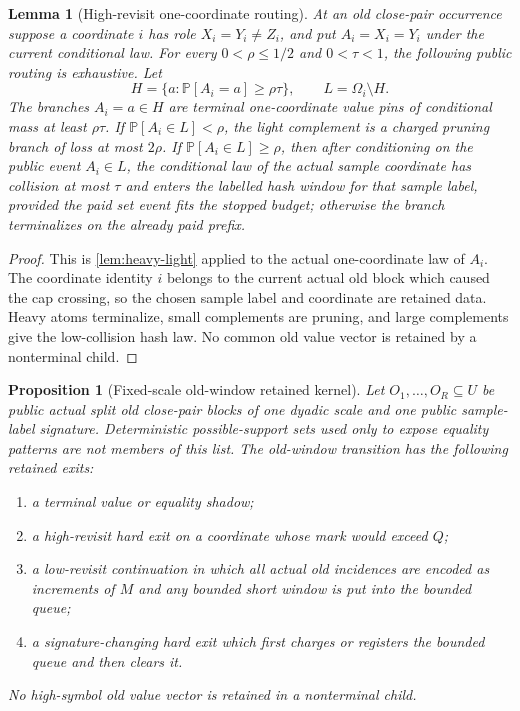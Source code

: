 \documentclass[11pt]{article}
\newcommand{\Cref}[1]{\ref{#1}}
\newtheorem{lemma}[theorem]{Lemma}
\newtheorem{proposition}[theorem]{Proposition}
\theoremstyle{remark}
\newcommand{\Prob}{\mathbb P}
\begin{document}
\begin{lemma}[High-revisit one-coordinate routing]\label{lem:high-revisit}
At an old close-pair occurrence suppose a coordinate $i$ has role $X_i=Y_i\ne Z_i$, and put $A_i=X_i=Y_i$ under the current conditional law.  For every $0<\rho\le1/2$ and $0<\tau<1$, the following public routing is exhaustive.  Let
\[
        H=\{a:\Prob[A_i=a]\ge\rho\tau\},\qquad L=\Omega_i\setminus H.
\]
The branches $A_i=a\in H$ are terminal one-coordinate value pins of conditional mass at least $\rho\tau$.  If $\Prob[A_i\in L]<\rho$, the light complement is a charged pruning branch of loss at most $2\rho$.  If $\Prob[A_i\in L]\ge\rho$, then after conditioning on the public event $A_i\in L$, the conditional law of the actual sample coordinate has collision at most $\tau$ and enters the labelled hash window for that sample label, provided the paid set event fits the stopped budget; otherwise the branch terminalizes on the already paid prefix.
\end{lemma}

\begin{proof}
This is \Cref{lem:heavy-light} applied to the actual one-coordinate law of $A_i$.  The coordinate identity $i$ belongs to the current actual old block which caused the cap crossing, so the chosen sample label and coordinate are retained data.  Heavy atoms terminalize, small complements are pruning, and large complements give the low-collision hash law.  No common old value vector is retained by a nonterminal child.
\end{proof}

\begin{proposition}[Fixed-scale old-window retained kernel]\label{prop:old-window}
Let $O_1,\ldots,O_R\subseteq U$ be public actual split old close-pair blocks of one dyadic scale and one public sample-label signature.  Deterministic possible-support sets used only to expose equality patterns are not members of this list.  The old-window transition has the following retained exits:
\begin{enumerate}[label=\textup{(\roman*)}]
\item a terminal value or equality shadow;
\item a high-revisit hard exit on a coordinate whose mark would exceed $Q$;
\item a low-revisit continuation in which all actual old incidences are encoded as increments of $M$ and any bounded short window is put into the bounded queue;
\item a signature-changing hard exit which first charges or registers the bounded queue and then clears it.
\end{enumerate}
No high-symbol old value vector is retained in a nonterminal child.
\end{proposition}
\end{document}
